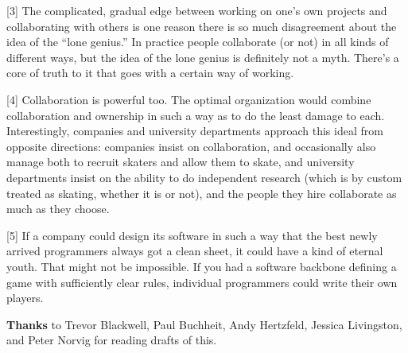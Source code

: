 {[}3{]} The complicated, gradual edge between working on one's own
projects and collaborating with others is one reason there is so much
disagreement about the idea of the ``lone genius.'' In practice people
collaborate (or not) in all kinds of different ways, but the idea of the
lone genius is definitely not a myth. There's a core of truth to it that
goes with a certain way of working.

{[}4{]} Collaboration is powerful too. The optimal organization would
combine collaboration and ownership in such a way as to do the least
damage to each. Interestingly, companies and university departments
approach this ideal from opposite directions: companies insist on
collaboration, and occasionally also manage both to recruit skaters and
allow them to skate, and university departments insist on the ability to
do independent research (which is by custom treated as skating, whether
it is or not), and the people they hire collaborate as much as they
choose.

{[}5{]} If a company could design its software in such a way that the
best newly arrived programmers always got a clean sheet, it could have a
kind of eternal youth. That might not be impossible. If you had a
software backbone defining a game with sufficiently clear rules,
individual programmers could write their own players.

\textbf{Thanks} to Trevor Blackwell, Paul Buchheit, Andy Hertzfeld,
Jessica Livingston, and Peter Norvig for reading drafts of this.

